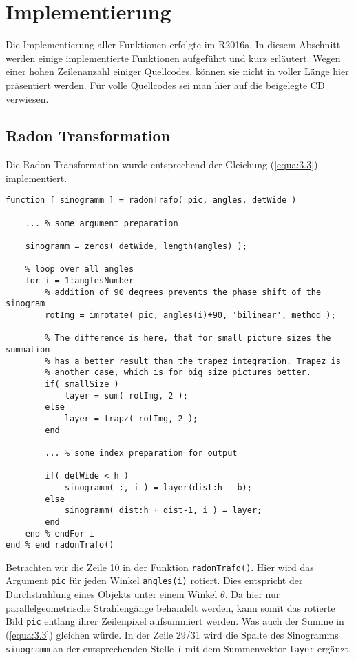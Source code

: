 \chapter{Implementierung}
\label{cha:A}

Die Implementierung aller Funktionen erfolgte im \MATLAB R2016a. In diesem Abschnitt werden einige implementierte Funktionen aufgeführt und kurz erläutert. Wegen einer hohen Zeilenanzahl einiger Quellcodes, können sie nicht in voller Länge hier präsentiert werden. Für volle Quellcodes sei man hier auf die beigelegte CD verwiesen.

\section{Radon Transformation}
\label{cha:A.1}

Die Radon Transformation wurde entsprechend der Gleichung (\ref{equa:3.3}) implementiert. 

\begin{lstlisting}[style=Matlab-editor,basicstyle=\color{black}\ttfamily\footnotesize, backgroundcolor=\color{white}]
function [ sinogramm ] = radonTrafo( pic, angles, detWide )
	
	... % some argument preparation 
	
	sinogramm = zeros( detWide, length(angles) );
	
	% loop over all angles
	for i = 1:anglesNumber
		% addition of 90 degrees prevents the phase shift of the sinogram
		rotImg = imrotate( pic, angles(i)+90, 'bilinear', method );      
		
		% The difference is here, that for small picture sizes the summation
		% has a better result than the trapez integration. Trapez is
		% another case, which is for big size pictures better.
		if( smallSize )  
			layer = sum( rotImg, 2 );      
		else      
			layer = trapz( rotImg, 2 );    
		end
		
		... % some index preparation for output
		
		if( detWide < h )
			sinogramm( :, i ) = layer(dist:h - b);
		else
			sinogramm( dist:h + dist-1, i ) = layer;
		end
	end % endFor i
end % end radonTrafo()  
\end{lstlisting}
\vspace{12pt}
Betrachten wir die Zeile 10 in der Funktion \verb|radonTrafo()|. Hier wird das Argument \verb|pic| für jeden Winkel \verb|angles(i)| rotiert. Dies entspricht der Durchstrahlung eines Objekts unter einem Winkel $\theta$. Da hier nur parallelgeometrische Strahlengänge behandelt werden, kann somit das rotierte Bild \verb|pic| entlang ihrer Zeilenpixel aufsummiert werden. Was auch der Summe in (\ref{equa:3.3}) gleichen würde. In der Zeile 29/31 wird die Spalte des Sinogramms \verb|sinogramm| an der entsprechenden Stelle \verb|i| mit dem Summenvektor \verb|layer| ergänzt.

